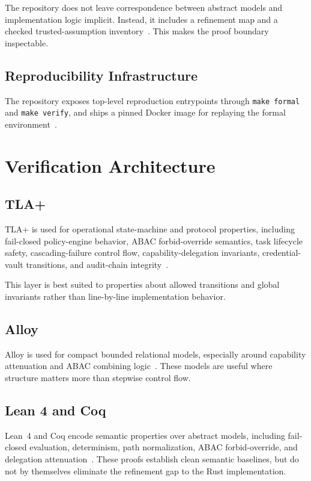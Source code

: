 \documentclass[11pt]{article}
\begin{document}
The repository does not leave correspondence between abstract models and
implementation logic implicit. Instead, it includes a refinement map and a
checked trusted-assumption inventory~\cite{vellavetoRefinementMap,vellavetoTCB}.
This makes the proof boundary inspectable.

\subsection{Reproducibility Infrastructure}

The repository exposes top-level reproduction entrypoints through
\texttt{make formal} and \texttt{make verify}, and ships a pinned Docker image
for replaying the formal environment~\cite{vellavetoFormalDocker}.

\section{Verification Architecture}

\subsection{TLA+}

TLA+ is used for operational state-machine and protocol properties, including
fail-closed policy-engine behavior, ABAC forbid-override semantics, task
lifecycle safety, cascading-failure control flow, capability-delegation
invariants, credential-vault transitions, and audit-chain integrity~\cite{lamport94,lamport02,vellavetoFormalInventory}.

This layer is best suited to properties about allowed transitions and global
invariants rather than line-by-line implementation behavior.

\subsection{Alloy}

Alloy is used for compact bounded relational models, especially around
capability attenuation and ABAC combining logic~\cite{jackson12}. These models
are useful where structure matters more than stepwise control flow.

\subsection{Lean 4 and Coq}

Lean~4 and Coq encode semantic properties over abstract models, including
fail-closed evaluation, determinism, path normalization, ABAC
forbid-override, and delegation attenuation~\cite{lean4,coq}. These proofs
establish clean semantic baselines, but do not by themselves eliminate the
refinement gap to the Rust implementation.
\end{document}
